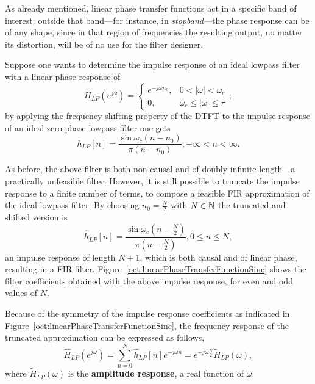 \documentclass[\documentfontsize, twocolumn]{\classname}
\begin{document}
As already mentioned, linear phase transfer functions act in a specific band of interest; outside that band---for instance, in \emph{stopband}---the phase response can be of any shape, since in that region of frequencies the resulting output, no matter its distortion, will be of no use for the filter designer.

Suppose one wants to determine the impulse response of an ideal lowpass filter with a linear phase response of
\[
    H_{LP} (e^{j\omega}) = 
    \left\{
        \begin{array}{ll}
            e^{-j\omega n_0}, & 0 < |\omega| < \omega_c\\
            0, & \omega_c \leq |\omega| \leq \pi
        \end{array}
    \right.;
\]
by applying the frequency-shifting property of the DTFT to the impulse response of an ideal zero phase lowpass filter one gets
\[
    h_{LP}[n] = \frac{
        \sin \omega_c(n - n_0)
    } {
        \pi (n - n_0)
    }, -\infty < n < \infty.
\]

As before, the above filter is both non-causal and of doubly infinite length---a practically unfeasible filter. However, it is still possible to truncate the impulse response to a finite number of terms, to compose a feasible FIR approximation of the ideal lowpass filter. By choosing $n_0 = \frac N 2$ with $N\in\mathbb N$ the truncated and shifted version is
\[
    \hat{h}_{LP}[n] = \frac{
        \sin \omega_c(n - \frac N 2)
    } {
        \pi (n - \frac N 2)
    }, 0 \leq n \leq N,
\]
an impulse response of length $N+1$, which is both causal and of linear phase, resulting in a FIR filter. Figure~\ref{oct:linearPhaseTransferFunctionSinc} shows the filter coefficients obtained with the above impulse response, for even and odd values of $N$.

\begin{figure*}[ht]
\begin{center}
\scalebox{0.5}{
    
}\caption{Stem plot of impulse response $\hat{h}_{LP}[n]$ for values $N = 12$ and $N = 13$. Notably, both are symmetric, and only the impulse response having an even $N$ value will possess a single, central peak.}\label{oct:linearPhaseTransferFunctionSinc}
\end{center}
\end{figure*}

Because of the symmetry of the impulse response coefficients as indicated in Figure~\ref{oct:linearPhaseTransferFunctionSinc}, the frequency response of the truncated approximation can be expressed as follows,
\[
    \hat{H}_{LP}(e^{j\omega}) = \sum_{n=0}^N \hat{h}_{LP}[n] e^{-j\omega n} = e^{-j\omega \frac N 2}\tilde{H}_{LP}(\omega),
\]
where $\tilde{H}_{LP}(\omega)$ is the \textbf{amplitude response}, a real function of $\omega$.
\end{document}
